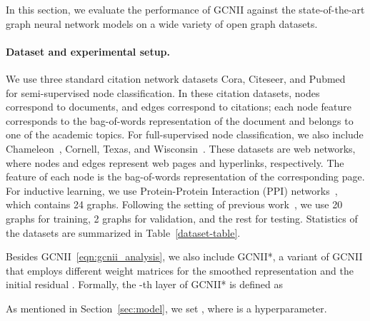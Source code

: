 \documentclass{article}
\begin{document}
In this section, we evaluate the performance of GCNII against
the state-of-the-art graph neural network models on a wide variety of open graph datasets.

\paragraph{Dataset and experimental setup.}
We use three standard citation network datasets Cora, Citeseer, and
Pubmed~\cite{DBLP:journals/aim/SenNBGGE08} for semi-supervised node
classification. In these citation datasets, nodes correspond to
documents, and edges correspond to citations; each node feature corresponds to
the bag-of-words representation of the document and  belongs to one
of the academic topics. 
For full-supervised node classification, we also
include  Chameleon~\cite{1909-13021}, Cornell, Texas, and
Wisconsin~\cite{Pei2020GeomGCN}. These datasets are web networks,
where nodes and edges represent web pages and hyperlinks, respectively. The feature of each node is the bag-of-words
representation of the corresponding page. For inductive learning, we
use Protein-Protein Interaction (PPI)
networks~\cite{hamilton2017inductive},  which contains 24
graphs. Following the setting of previous work~\cite{velickovic2018graph},  we
use  20 
graphs for training, 2 graphs for validation, and the rest for
testing. Statistics of the datasets are summarized in  Table~\ref{dataset-table}.

Besides GCNII~\eqref{eqn:gcnii_analysis}, we also include GCNII*, a variant of GCNII that employs different weight matrices
for the smoothed representation
  and the  initial residual
. Formally, the -th layer of GCNII* is
defined as
    
  As mentioned in Section~\ref{sec:model}, we set , where  is a hyperparameter. 
\end{document}
